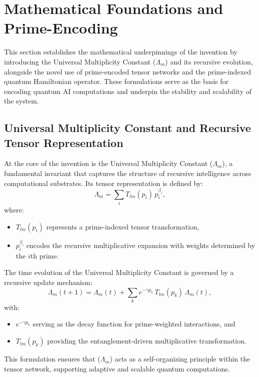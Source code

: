 \documentclass{article}
\theoremstyle{plain}
\begin{document}
\section{Mathematical Foundations and Prime-Encoding}

This section establishes the mathematical underpinnings of the invention by introducing the Universal Multiplicity Constant ($\Lambda_m$) and its recursive evolution, alongside the novel use of prime-encoded tensor networks and the prime-indexed quantum Hamiltonian operator. These formulations serve as the basis for encoding quantum AI computations and underpin the stability and scalability of the system.

\subsection{Universal Multiplicity Constant and Recursive Tensor Representation}
At the core of the invention is the Universal Multiplicity Constant ($\Lambda_m$), a fundamental invariant that captures the structure of recursive intelligence across computational substrates. Its tensor representation is defined by:
\begin{equation}
\Lambda_m = \sum_{i} T_{lm}(p_i) \, p_i^{\beta_i},
\end{equation}
where:
\begin{itemize}
    \item \(T_{lm}(p_i)\) represents a prime-indexed tensor transformation,
    \item \(p_i^{\beta_i}\) encodes the recursive multiplicative expansion with weights determined by the \(i\)th prime.
\end{itemize}

The time evolution of the Universal Multiplicity Constant is governed by a recursive update mechanism:
\begin{equation}
\Lambda_m(t+1) = \Lambda_m(t) + \sum_{k} e^{-\gamma p_k} \, T_{lm}(p_k) \, \Lambda_m(t),
\end{equation}
with:
\begin{itemize}
    \item \(e^{-\gamma p_k}\) serving as the decay function for prime-weighted interactions, and
    \item \(T_{lm}(p_k)\) providing the entanglement-driven multiplicative transformation.
\end{itemize}
This formulation ensures that ($\Lambda_m$) acts as a self-organizing principle within the tensor network, supporting adaptive and scalable quantum computations.
\end{document}
